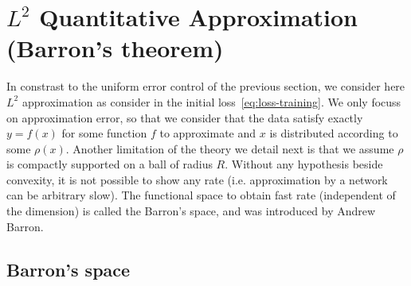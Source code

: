 \section{$L^2$ Quantitative Approximation (Barron's theorem)}

In constrast to the uniform error control of the previous section, we consider here $L^2$ approximation as consider in the initial loss~\eqref{eq:loss-training}. We only focuss on approximation error, so that we consider that the data satisfy exactly $y=f(x)$ for some function $f$ to approximate and $x$ is distributed according to some $\rho(x)$. Another limitation of the theory we detail next is that we assume $\rho$ is compactly supported on a ball of radius $R$. 
%
Without any hypothesis beside convexity, it is not possible to show any rate (i.e. approximation by a network can be arbitrary slow). The functional space to obtain fast rate (independent of the dimension) is called the Barron's space, and was introduced by Andrew Barron. 

\subsection{Barron's space}

